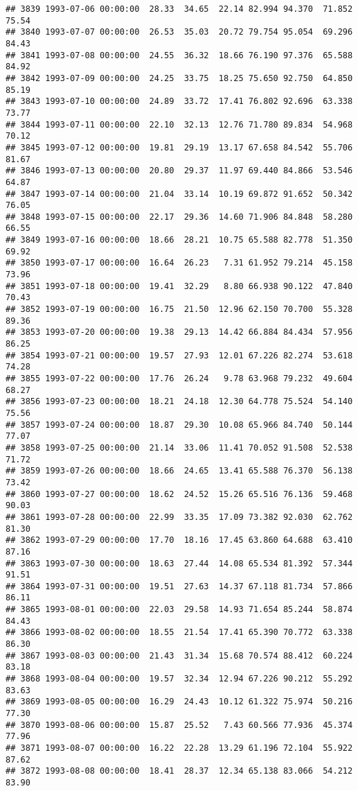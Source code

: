 \documentclass{article}\usepackage{graphicx, color}
\makeatletter
\newenvironment{kframe}{%
 \def\at@end@of@kframe{}%
 \ifinner\ifhmode%
  \def\at@end@of@kframe{\end{minipage}}%
  \begin{minipage}{\columnwidth}%
 \fi\fi%
 \def\FrameCommand##1{\hskip\@totalleftmargin \hskip-\fboxsep
 \colorbox{shadecolor}{##1}\hskip-\fboxsep
     \hskip-\linewidth \hskip-\@totalleftmargin \hskip\columnwidth}%
 \MakeFramed {\advance\hsize-\width
   \@totalleftmargin\z@ \linewidth\hsize
   \@setminipage}}%
 {\par\unskip\endMakeFramed%
 \at@end@of@kframe}
\newenvironment{knitrout}{}{} %
\makeatother
\begin{document}
\begin{knitrout}
\begin{kframe}
\begin{verbatim}
## 3839 1993-07-06 00:00:00  28.33  34.65  22.14 82.994 94.370  71.852  75.54
## 3840 1993-07-07 00:00:00  26.53  35.03  20.72 79.754 95.054  69.296  84.43
## 3841 1993-07-08 00:00:00  24.55  36.32  18.66 76.190 97.376  65.588  84.92
## 3842 1993-07-09 00:00:00  24.25  33.75  18.25 75.650 92.750  64.850  85.19
## 3843 1993-07-10 00:00:00  24.89  33.72  17.41 76.802 92.696  63.338  73.77
## 3844 1993-07-11 00:00:00  22.10  32.13  12.76 71.780 89.834  54.968  70.12
## 3845 1993-07-12 00:00:00  19.81  29.19  13.17 67.658 84.542  55.706  81.67
## 3846 1993-07-13 00:00:00  20.80  29.37  11.97 69.440 84.866  53.546  64.87
## 3847 1993-07-14 00:00:00  21.04  33.14  10.19 69.872 91.652  50.342  76.05
## 3848 1993-07-15 00:00:00  22.17  29.36  14.60 71.906 84.848  58.280  66.55
## 3849 1993-07-16 00:00:00  18.66  28.21  10.75 65.588 82.778  51.350  69.92
## 3850 1993-07-17 00:00:00  16.64  26.23   7.31 61.952 79.214  45.158  73.96
## 3851 1993-07-18 00:00:00  19.41  32.29   8.80 66.938 90.122  47.840  70.43
## 3852 1993-07-19 00:00:00  16.75  21.50  12.96 62.150 70.700  55.328  89.36
## 3853 1993-07-20 00:00:00  19.38  29.13  14.42 66.884 84.434  57.956  86.25
## 3854 1993-07-21 00:00:00  19.57  27.93  12.01 67.226 82.274  53.618  74.28
## 3855 1993-07-22 00:00:00  17.76  26.24   9.78 63.968 79.232  49.604  68.27
## 3856 1993-07-23 00:00:00  18.21  24.18  12.30 64.778 75.524  54.140  75.56
## 3857 1993-07-24 00:00:00  18.87  29.30  10.08 65.966 84.740  50.144  77.07
## 3858 1993-07-25 00:00:00  21.14  33.06  11.41 70.052 91.508  52.538  71.72
## 3859 1993-07-26 00:00:00  18.66  24.65  13.41 65.588 76.370  56.138  73.42
## 3860 1993-07-27 00:00:00  18.62  24.52  15.26 65.516 76.136  59.468  90.03
## 3861 1993-07-28 00:00:00  22.99  33.35  17.09 73.382 92.030  62.762  81.30
## 3862 1993-07-29 00:00:00  17.70  18.16  17.45 63.860 64.688  63.410  87.16
## 3863 1993-07-30 00:00:00  18.63  27.44  14.08 65.534 81.392  57.344  91.51
## 3864 1993-07-31 00:00:00  19.51  27.63  14.37 67.118 81.734  57.866  86.11
## 3865 1993-08-01 00:00:00  22.03  29.58  14.93 71.654 85.244  58.874  84.43
## 3866 1993-08-02 00:00:00  18.55  21.54  17.41 65.390 70.772  63.338  86.30
## 3867 1993-08-03 00:00:00  21.43  31.34  15.68 70.574 88.412  60.224  83.18
## 3868 1993-08-04 00:00:00  19.57  32.34  12.94 67.226 90.212  55.292  83.63
## 3869 1993-08-05 00:00:00  16.29  24.43  10.12 61.322 75.974  50.216  77.30
## 3870 1993-08-06 00:00:00  15.87  25.52   7.43 60.566 77.936  45.374  77.96
## 3871 1993-08-07 00:00:00  16.22  22.28  13.29 61.196 72.104  55.922  87.62
## 3872 1993-08-08 00:00:00  18.41  28.37  12.34 65.138 83.066  54.212  83.90

\end{verbatim}
\end{kframe}
\end{knitrout}
\end{document}
